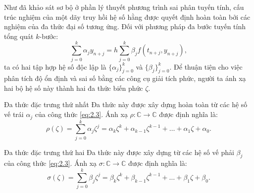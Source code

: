 Như đã khảo sát sơ bộ ở phần lý thuyết phương trình sai phân tuyến tính, cấu trúc nghiệm của một dãy truy hồi hệ số hằng được quyết định hoàn toàn bởi các nghiệm của đa thức đại số tương ứng. Đối với phương pháp đa bước tuyến tính tổng quát $k$-bước:
\begin{equation}
    \sum_{j=0}^{k} \alpha_j y_{n+j} = h \sum_{j=0}^{k} \beta_j f(t_{n+j}, y_{n+j}), \tag{2.3} \label{eq:2.3}
\end{equation}
ta có hai tập hợp hệ số độc lập là $\{\alpha_j\}_{j=0}^k$ và $\{\beta_j\}_{j=0}^k$. Để thuận tiện cho việc phân tích độ ổn định và sai số bằng các công cụ giải tích phức, người ta ánh xạ hai bộ hệ số này thành hai đa thức biến phức $\zeta$.

\vspace{0.5em}
\begin{baitapbox}{Đa thức đặc trưng thứ nhất}
    Đa thức này được xây dựng hoàn toàn từ các hệ số vế trái $\alpha_j$ của công thức \eqref{eq:2.3}. Ánh xạ $\rho: \mathbb{C} \to \mathbb{C}$ được định nghĩa là:
\begin{equation}
    \rho(\zeta) = \sum_{j=0}^{k} \alpha_j \zeta^j = \alpha_k \zeta^k + \alpha_{k-1} \zeta^{k-1} + \dots + \alpha_1 \zeta + \alpha_0. \tag{2.4} \label{eq:2.4}
\end{equation}
\end{baitapbox}



\vspace{0.5em}
\begin{baitapbox}{Đa thức đặc trưng thứ hai}
    Đa thức này được xây dựng từ các hệ số vế phải $\beta_j$ của công thức \eqref{eq:2.3}. Ánh xạ $\sigma: \mathbb{C} \to \mathbb{C}$ được định nghĩa là:
\begin{equation}
    \sigma(\zeta) = \sum_{j=0}^{k} \beta_j \zeta^j = \beta_k \zeta^k + \beta_{k-1} \zeta^{k-1} + \dots + \beta_1 \zeta + \beta_0. \tag{2.5} \label{eq:2.5}
\end{equation}
\end{baitapbox}


